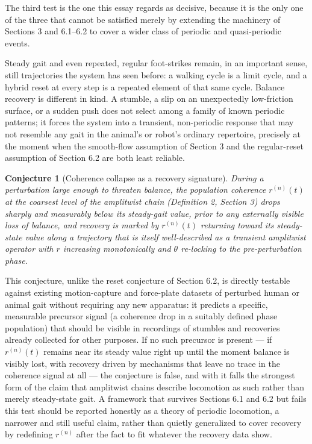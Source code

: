\documentclass[12pt]{article}
\newtheorem{conjecture}{Conjecture}
\begin{document}
The third test is the one this essay regards as decisive, because it is the only one of the three that cannot be satisfied merely by extending the machinery of Sections 3 and 6.1--6.2 to cover a wider class of periodic and quasi-periodic events.

Steady gait and even repeated, regular foot-strikes remain, in an important sense, still trajectories the system has seen before: a walking cycle is a limit cycle, and a hybrid reset at every step is a repeated element of that same cycle. Balance recovery is different in kind. A stumble, a slip on an unexpectedly low-friction surface, or a sudden push does not select among a family of known periodic patterns; it forces the system into a transient, non-periodic response that may not resemble any gait in the animal's or robot's ordinary repertoire, precisely at the moment when the smooth-flow assumption of Section 3 and the regular-reset assumption of Section 6.2 are both least reliable.

\begin{conjecture}[Coherence collapse as a recovery signature]
During a perturbation large enough to threaten balance, the population coherence $r^{(n)}(t)$ at the coarsest level of the amplitwist chain (Definition 2, Section 3) drops sharply and measurably below its steady-gait value, prior to any externally visible loss of balance, and recovery is marked by $r^{(n)}(t)$ returning toward its steady-state value along a trajectory that is itself well-described as a transient amplitwist operator with $r$ increasing monotonically and $\theta$ re-locking to the pre-perturbation phase.
\end{conjecture}

This conjecture, unlike the reset conjecture of Section 6.2, is directly testable against existing motion-capture and force-plate datasets of perturbed human or animal gait without requiring any new apparatus: it predicts a specific, measurable precursor signal (a coherence drop in a suitably defined phase population) that should be visible in recordings of stumbles and recoveries already collected for other purposes. If no such precursor is present — if $r^{(n)}(t)$ remains near its steady value right up until the moment balance is visibly lost, with recovery driven by mechanisms that leave no trace in the coherence signal at all — the conjecture is false, and with it falls the strongest form of the claim that amplitwist chains describe locomotion as such rather than merely steady-state gait. A framework that survives Sections 6.1 and 6.2 but fails this test should be reported honestly as a theory of periodic locomotion, a narrower and still useful claim, rather than quietly generalized to cover recovery by redefining $r^{(n)}$ after the fact to fit whatever the recovery data show.
\end{document}
